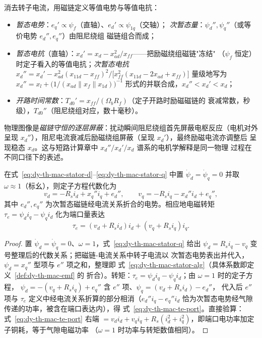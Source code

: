 \begin{definition}\label{def:dy-th-mac-emf}
消去转子电流，用磁链定义等值电势与等值电抗：
\begin{itemize}
  \item \emph{暂态电势}：$e_q'\propto\psi_f$（直轴）、$e_d'\propto\psi_{1q}$（交轴）；
        \emph{次暂态量}：$\psi_d'',\psi_q''$（或等价电势 $e_d'',e_q''$）由阻尼绕组
        磁链组合而成；
  \item \emph{暂态电抗}（直轴）：$x_d'=x_d-x_{ad}^2/x_{ff}$——把励磁绕组磁链"冻结"
        （$\psi_f$ 恒定）时定子看入的等值电抗；\emph{次暂态电抗}
        $x_d''=x_d'-x_{ad}^2(x_{11d}-x_{ff})^2/\bigl[x_{ff}^2(x_{11d}-2x_{ad}+x_{ff})\bigr]$
        量级地写为 $x_d''=x_l+\bigl(1/(x_{ad}\parallel x_{f}\parallel x_{1d})\bigr)^{-1}$
        形式的并联合成，$x_d''<x_d'<x_d$；
  \item \emph{开路时间常数}：$T_{d0}'=x_{ff}/(\Omega_bR_f)$（定子开路时励磁磁链的
        衰减常数，秒级），$T_{d0}''$（阻尼绕组对应，数十毫秒）。
\end{itemize}
\end{definition}

物理图像是\emph{磁链守恒的逐层屏蔽}：扰动瞬间阻尼绕组首先屏蔽电枢反应（电机对外
呈现 $x_d''$），阻尼电流衰减后励磁绕组屏蔽（呈现 $x_d'$），最终励磁电流亦调整后
呈现稳态 $x_d$。这与短路计算章中 $x_d''/x_d'/x_d$ 谱系的电机学解释是同一物理
过程在不同口径下的表述。

\begin{proposition}[定子暂态忽略与定子代数方程]\label{prop:dy-th-mac-stator-alg}
在式~\eqref{eq:dy-th-mac-stator-d}--\eqref{eq:dy-th-mac-stator-q} 中置
$\dot\psi_d=\dot\psi_q=0$ 并取 $\omega\approx1$（标幺），则定子方程代数化为
\begin{equation}
v_d=-R_si_d+x_q''i_q+e_d'',\qquad
v_q=-R_si_q-x_d''i_d+e_q'',
\label{eq:dy-th-mac-stator-alg}
\end{equation}
其中 $e_d'',e_q''$ 为次暂态磁链经电流关系折合的电势。相应地电磁转矩
$\tau_e=\psi_di_q-\psi_qi_d$ 化为端口量表达
\begin{equation}
\tau_e=(v_d+R_si_d)i_d+(v_q+R_si_q)i_q .
\label{eq:dy-th-mac-te-port}
\end{equation}
\end{proposition}

\begin{proof}
置 $\dot\psi_d=\dot\psi_q=0$、$\omega=1$，式~\eqref{eq:dy-th-mac-stator-q} 给出
$\psi_d=R_si_q-v_q$ 变号整理后的代数关系；把磁链-电流关系中转子电流以
次暂态电势表出并代入，$\psi_d=x_q''\text{ 型项与 }e''\text{ 项之和}$，整理即
式~\eqref{eq:dy-th-mac-stator-alg}（具体系数即定义~\ref{def:dy-th-mac-emf} 的
折合）。转矩：$\tau_e=\psi_di_q-\psi_qi_d$；由 $\omega=1$ 时的定子方程，
$\psi_d=-(v_q+R_si_q)+e_q''$ 含 $e''$ 项、$\psi_q=(v_d+R_si_d)-e_d''$，
代入后 $e''$ 项与 $\tau_e$ 定义中经电流关系折算的部分相消（$e_d''i_q-e_q''i_d$
恰为次暂态电势经气隙传递的功率，被含在端口表达内），得
式~\eqref{eq:dy-th-mac-te-port}。直接验算：式~\eqref{eq:dy-th-mac-te-port} 右端
$=v_di_d+v_qi_q+R_s(i_d^2+i_q^2)$，即端口电功率加定子铜耗，等于气隙电磁功率
（$\omega=1$ 时功率与转矩数值相同）。
\end{proof}

